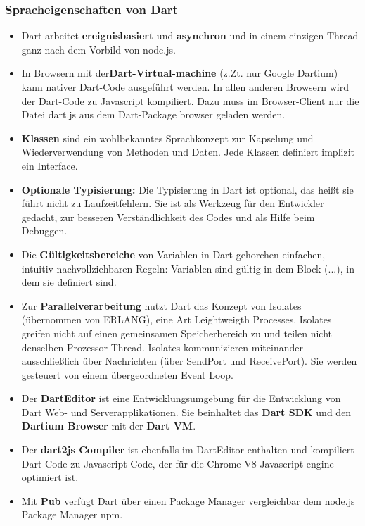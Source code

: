 \subsubsection{Spracheigenschaften von Dart}\label{s.Spracheigenschaften von Dart}
\begin{itemize}

\item Dart arbeitet {\bf ereignisbasiert} und {\bf asynchron} und in einem einzigen Thread ganz nach dem Vorbild von node.js.
\item  In Browsern mit der{\bf Dart-Virtual-machine} (z.Zt. nur Google Dartium) kann nativer Dart-Code ausgeführt werden. In allen anderen Browsern wird der Dart-Code zu Javascript kompiliert. Dazu muss im Browser-Client nur die Datei dart.js aus dem Dart-Package browser geladen werden.
 
\item {\bf Klassen } sind ein wohlbekanntes Sprachkonzept zur Kapselung und Wiederverwendung von Methoden und Daten. Jede Klassen definiert implizit ein Interface.
\item {\bf Optionale Typisierung:}
Die Typisierung in Dart ist optional, das heißt sie führt nicht zu Laufzeitfehlern. Sie ist als Werkzeug für den Entwickler gedacht, zur besseren Verständlichkeit des Codes und als Hilfe beim Debuggen.
\item Die  {\bf Gültigkeitsbereiche}
von Variablen in Dart gehorchen einfachen, intuitiv nachvollziehbaren Regeln: Variablen sind gültig in dem Block ({...}), in dem sie definiert sind.
\item
Zur {\bf Parallelverarbeitung} nutzt Dart das Konzept von Isolates (übernommen von ERLANG), eine Art Leightweigth Processes. Isolates greifen nicht auf einen gemeinsamen Speicherbereich zu und teilen nicht denselben Prozessor-Thread. Isolates kommunizieren miteinander ausschließlich über Nachrichten (über SendPort und ReceivePort). Sie werden gesteuert von einem übergeordneten Event Loop.
\item Der {\bf DartEditor} ist eine Entwicklungsumgebung für die Entwicklung von Dart Web- und Serverapplikationen. Sie beinhaltet das {\bf Dart SDK } und den {\bf Dartium Browser} mit der {\bf Dart VM}.
\item Der {\bf dart2js Compiler} ist ebenfalls im DartEditor enthalten und kompiliert Dart-Code zu Javascript-Code, der für die Chrome V8 Javascript engine optimiert ist.
\item Mit {\bf Pub} verfügt Dart über einen Package Manager vergleichbar dem node.js Package Manager npm.
\end{itemize}
\cite{dartvsjs}\cite{builddartapps}

